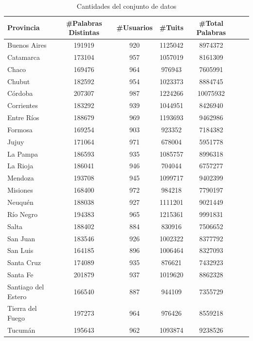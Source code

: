 \begin{table}[ht]
\centering


\begin{tabular}[width=0.7\textwidth]{|l|c|c|c|c|c|c|}
\hline
Provincia      & \#Palabras Distintas & \#Usuarios & \#Tuits & \#Total Palabras \\ \hline
Buenos Aires   & 191919       & 920          & 1125042    & 8974372  \\
Catamarca      & 173104       & 957          & 1057019    & 8161309   \\
Chaco          & 169476       & 964          & 976943     & 7605991   \\
Chubut         & 182592       & 954          & 1023373    & 8884745   \\
Córdoba        & 207307       & 987          & 1224266    & 10075932  \\
Corrientes     & 183292       & 939          & 1044951    & 8426940   \\
Entre Ríos     & 188679       & 969          & 1193693    & 9462986  \\
Formosa        & 169254       & 903          & 923352     & 7184382   \\
Jujuy          & 171064       & 971          & 678004     & 5951778   \\
La Pampa       & 186593       & 935          & 1085757    & 8996318  \\
La Rioja       & 186041       & 946          & 704044     & 6757277  \\
Mendoza        & 193708       & 945          & 1099717    & 9402399   \\
Misiones       & 168400       & 972          & 984218     & 7790197   \\
Neuquén        & 188038       & 927          & 1111201    & 9021449   \\
Río Negro      & 194383       & 965          & 1215361    & 9991831  \\
Salta          & 188402       & 884          & 830916     & 7506652   \\
San Juan       & 183546       & 926          & 1002322    & 8377792  \\
San Luis       & 164185       & 896          & 1006464    & 8327093  \\
Santa Cruz     & 174089       & 935          & 876621     & 7432923  \\
Santa Fe       & 201879       & 937          & 1019620    & 8862328  \\
Santiago del Estero       & 166540       & 887          & 944109     & 7355729  \\
Tierra del Fuego & 197273       & 964          & 976426     & 8559218   \\
Tucumán        & 195643       & 962          & 1093874    & 9238526 \\
  \hline
\end{tabular}
\caption{Cantidades del conjunto de datos}
\label{tab:cantidades}
\end{table}



